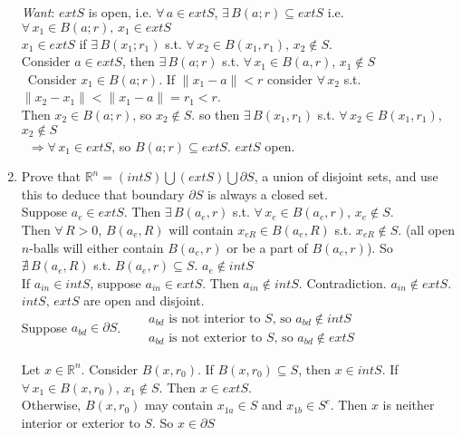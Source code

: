 \documentclass[twoside]{amsart}
\theoremstyle{plain}
\theoremstyle{definition}
\begin{document}
\begin{enumerate}
\emph{Want}: $ext{S}$ is open, i.e. $\forall \, a \in ext{S}$, $\exists \, B(a;r) \subseteq ext{S}$ i.e. \\
\quad \quad $\forall \, x_1 \in B(a;r), \, x_1 \in ext{S}$ \\
\quad \quad $x_1 \in ext{S}$ if $\exists \, B(x_1;r_1)$ s.t. $\forall \, x_2 \in B(x_1,r_1)$, $x_2 \notin S$.  \smallskip \\

Consider $a\in ext{S}$, then $\exists \, B(a;r)$ s.t. $\forall \, x_1 \in B(a,r)$, $x_1 \notin S$  \\
\quad \, Consider $x_1 \in B(a;r)$.  If $\| x_1 - a\| < r$ consider $\forall \, x_2$ s.t. $\| x_2 - x_1 \| < \| x_1 - a \| = r_1 <r$.  \\
\quad \quad Then $x_2 \in B(a;r)$, so $x_2 \notin S$.  so then $\exists \, B(x_1,r_1)$ s.t. $\forall \, x_2 \in B(x_1,r_1)$, $x_2 \notin S$ \\
\quad \quad \, $\Longrightarrow \forall \, x_1 \in ext{S}$, so $B(a;r) \subseteq ext{S}$.  $ext{S}$ open.   
\item Prove that $\mathbb{R}^n = (int{S}) \bigcup (ext{S}) \bigcup \partial S$, a union of disjoint sets, and use this to deduce that boundary $\partial S$ is always a closed set.  \medskip \\

Suppose $a_e \in ext{S}$.  Then $\exists \, B(a_e,r)$ s.t. $\forall \, x_e \in B(a_e,r)$, $x_e \notin S$.  \\
Then $\forall \, R > 0$, $B(a_e, R)$ will contain $x_{eR} \in B(a_e,R)$ s.t. $x_{eR} \notin S$. (all open $n$-balls will either contain $B(a_e,r)$ or be a part of $B(a_e,r)$).  So $\nexists \, B(a_e,R)$ s.t. $B(a_e,r) \subseteq S$.  $a_e \notin int{S}$ \smallskip \\

If $a_{in} \in int{S}$, suppose $a_{in} \in  ext{S}$.  Then $a_{in} \notin int{S}$.  Contradiction.  $a_{in} \notin ext{S}$.  \medskip \\
\quad \quad $int{S}, \, ext{S}$ are open and disjoint.  \medskip \\

Suppose $a_{bd} \in \partial S$.  $\begin{aligned}
  & \text{ $a_{bd}$ is not interior to $S$, so $a_{bd} \notin int{S}$ }\\
  & \text{ $a_{bd}$ is not exterior to $S$, so $a_{bd} \notin ext{S}$}
\end{aligned} $

Let $x \in \mathbb{R}^n$.  Consider $B(x,r_0)$.  If $B(x,r_0) \subseteq S$, then $x\in int{S}$.  If $\forall \, x_1 \in B(x,r_0)$, $x_1 \notin S$.  Then $x\in ext{S}$.  \smallskip \\
\quad \quad Otherwise, $B(x,r_0)$ may contain $x_{1a} \in S$ and $x_{1b} \in S^c$.  Then $x$ is neither interior or exterior to $S$.  So $x \in \partial S$ \smallskip \\


\end{enumerate}
\end{document}
